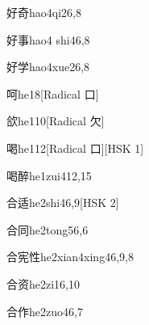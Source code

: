 \begin{entry}{好奇}{hao4qi2}{6,8}
\end{entry}

\begin{entry}{好事}{hao4 shi4}{6,8}
\end{entry}

\begin{entry}{好学}{hao4xue2}{6,8}
\end{entry}

\begin{entry}{呵}{he1}{8}[Radical 口]
\end{entry}

\begin{entry}{欱}{he1}{10}[Radical 欠]
\end{entry}

\begin{entry}{喝}{he1}{12}[Radical 口][HSK 1]
\end{entry}

\begin{entry}{喝醉}{he1zui4}{12,15}
\end{entry}

\begin{entry}{合适}{he2shi4}{6,9}[HSK 2]
\end{entry}

\begin{entry}{合同}{he2tong5}{6,6}
\end{entry}

\begin{entry}{合宪性}{he2xian4xing4}{6,9,8}
\end{entry}

\begin{entry}{合资}{he2zi1}{6,10}
\end{entry}

\begin{entry}{合作}{he2zuo4}{6,7}
\end{entry}

